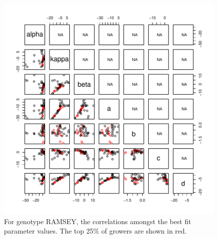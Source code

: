 \documentclass[12pt,reqno,final]{amsart}
\theoremstyle{plain}
\numberwithin{equation}{part}
\begin{document}
\begin{figure}
\includegraphics{Comparing_best_fit_parameters_against_Adriana_winners_and_losers-010}
\caption{For genotype RAMSEY, the correlations amongst the best fit
  parameter values. The top 25\% of growers are shown in red.}
\end{figure}
\end{document}
